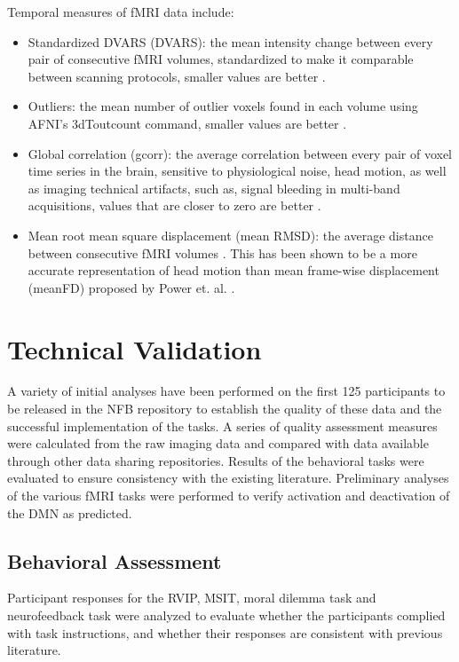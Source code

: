 Temporal measures of fMRI data include:

\begin{itemize}
    \item Standardized DVARS (DVARS): the mean intensity change between every pair of consecutive fMRI volumes, standardized to make it comparable between scanning protocols, smaller values are better \cite{Nichols2012}.
    \item Outliers: the mean number of outlier voxels found in each volume using AFNI’s 3dToutcount command, smaller values are better \cite{Cox1996}.
    \item Global correlation (gcorr): the average correlation between every pair of voxel time series in the brain, sensitive to physiological noise, head motion, as well as imaging technical artifacts, such as, signal bleeding in multi-band acquisitions, values that are closer to zero are better \cite{Saad2013}.
    \item Mean root mean square displacement (mean RMSD): the average distance between consecutive fMRI volumes \cite{Jenkinson99FD}. This has been shown to be a more accurate representation of head motion than mean frame-wise displacement (meanFD) proposed by Power et. al. \cite{power2012} \cite{yan2013}.
\end{itemize}

\section{Technical Validation}
A variety of initial analyses have been performed on the first 125 participants to be released in the NFB repository to establish the quality of these data and the successful implementation of the tasks. A series of quality assessment measures were calculated from the raw imaging data and compared with data available through other data sharing repositories. Results of the behavioral tasks were evaluated to ensure consistency with the existing literature. Preliminary analyses of the various fMRI tasks were performed to verify activation and deactivation of the DMN as predicted.

\subsection{Behavioral Assessment}
Participant responses for the RVIP, MSIT, moral dilemma task and neurofeedback task were analyzed to evaluate whether the participants complied with task instructions, and whether their responses are consistent with previous literature.

